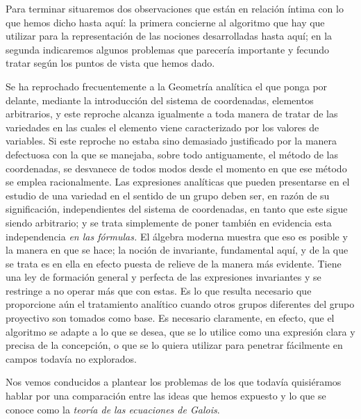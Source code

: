 \documentclass[a4paper, 12pt]{article}
\begin{document}
Para terminar situaremos dos observaciones que están en relación íntima con lo que hemos dicho hasta aquí: la primera concierne al algoritmo que hay que utilizar para la representación de las nociones desarrolladas hasta aquí; en la segunda indicaremos algunos problemas que parecería importante y fecundo tratar según los puntos de vista que hemos dado.

Se ha reprochado frecuentemente a la Geometría analítica el que ponga por delante, mediante la introducción del sistema de coordenadas, elementos arbitrarios, y este reproche alcanza igualmente a toda manera de tratar de las variedades en las cuales el elemento viene caracterizado por los valores de variables. Si este reproche no estaba sino demasiado justificado por la manera defectuosa con la que se manejaba, sobre todo antiguamente, el método de las coordenadas, se desvanece de todos modos desde el momento en que ese método se emplea racionalmente. Las expresiones analíticas que pueden presentarse en el estudio de una variedad en el sentido de un grupo deben ser, en razón de su significación, independientes del sistema de coordenadas, en tanto que este sigue siendo arbitrario; y se trata simplemente de poner también en evidencia esta independencia \textit{en las fórmulas.} El álgebra moderna muestra que eso es posible y la manera en que se hace; la noción de invariante, fundamental aquí, y de la que se trata es en ella en efecto puesta de relieve de la manera más evidente. Tiene una ley de formación general y perfecta de las expresiones invariantes y se restringe a no operar más que con estas. Es lo que resulta necesario que proporcione aún el tratamiento analítico cuando otros grupos diferentes del grupo proyectivo son tomados como base. Es necesario claramente, en efecto, que el algoritmo se adapte a lo que se desea, que se lo utilice como una expresión clara y precisa de la concepción, o que se lo quiera utilizar para penetrar fácilmente en campos todavía no explorados.

Nos vemos conducidos a plantear los problemas de los que todavía quisiéramos hablar por una comparación entre las ideas que hemos expuesto y lo que se conoce como la \textit{teoría de las ecuaciones de Galois}.
\end{document}
